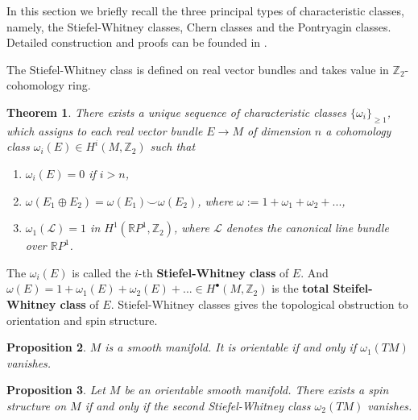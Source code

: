 \documentclass[11pt]{article}
\newtheorem{thm}{Theorem}[section]
\newtheorem{prop}[thm]{Proposition}
\newcommand{\reals}{\mathbb R}
\newcommand{\intg}{\mathbb Z}
\begin{document}
	In this section we briefly recall the three principal types of characteristic classes, namely, the Stiefel-Whitney classes, Chern classes and the Pontryagin classes. Detailed construction and proofs can be founded in \cite{bott2013differential,milnor1974characteristic}.

	The Stiefel-Whitney class is defined on real vector bundles and takes value in $\intg_2$-cohomology ring. 
	\begin{thm}
	There exists a unique sequence of characteristic classes $\{\omega_i\}_{\geq1}$, which assigns to each real vector bundle $E\rightarrow M$ of dimension $n$ a cohomology class
	 $\omega_i(E)\in H^i(M,\intg_2)$ such that
	\begin{enumerate}[label=(\alph*)]
	\item $\omega_i(E)=0$ if $i>n$,
	\item $\omega(E_1\oplus E_2)=\omega(E_1)\smile\omega(E_2)$, where $\omega:=1+\omega_1+\omega_2+...$,
	\item $\omega_1(\mathcal{L})=1$ in $H^1(\reals P^1,\intg_2)$, where $\mathcal{L}$ denotes the canonical line bundle over $\reals P^1$. 
	\end{enumerate}
	\end{thm}
	The $\omega_i(E)$ is called the $i$-th \textbf{Stiefel-Whitney class} of $E$. And $\omega(E)=1+\omega_1(E)+\omega_2(E)+...\in H^\bullet(M,\intg_2)$ is the \textbf{total Steifel-Whitney class} of $E$. Stiefel-Whitney classes gives the topological obstruction to orientation and spin structure.
	\begin{prop}
		$M$ is a smooth manifold. It is orientable if and only if $\omega_1(TM)$ vanishes.
	\end{prop}

	\begin{prop}
		Let $M$ be an orientable smooth manifold. There exists a spin structure on $M$ if and only if the second Stiefel-Whitney class $\omega_2(TM)$ vanishes.
	\end{prop}
\end{document}

